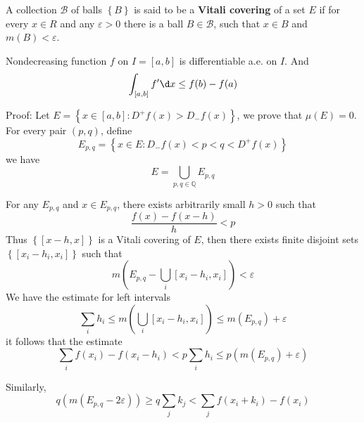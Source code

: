 \documentclass[12pt, a4paper, oneside]{book}
\begin{document}
\begin{definition}
    A collection $\mathcal{B}$ of balls $\left\{B\right\}$ is said to be a \textbf{Vitali covering} of a set $E$ if for every $x \in R$ and any $\varepsilon >0$ there is a ball $B \in \mathcal{B}$, such that $x\in B$ and $m\left(B\right) < \varepsilon$.
\end{definition}

\begin{theorem}

\end{theorem}


\begin{theorem}
    Nondecreasing function $f$ on $I=[a,b]$ is differentiable a.e. on $I$. And
    \begin{equation*}
        \int_{[a,b]} f' \d x \leq f(b) -f(a)
    \end{equation*}

    Proof:
    Let
    \( E =  \left\{x \in [a, b] : D^+ f(x) > D_- f(x) \right\} \), we prove that \( \mu(E) = 0 \).
    For every pair $\left(p,q\right)$, define
    \begin{equation*}
        E_{p,q}
        =
        \left\{x\in E : D_{-}f(x)<p<q< D^+ f(x) \right\}
    \end{equation*}
    we have
    \begin{equation*}
        E
        =
        \bigcup_{p,q \in \mathbb{Q}} E_{p,q}
    \end{equation*}

    For any $E_{p,q}$ and $x\in E_{p,q}$, there exists arbitrarily small $h >0$ such that
    \begin{equation*}
        \frac{f(x)-f(x-h)}{h} <p
    \end{equation*}
    Thus $\left\{[x-h,x]\right\}$ is a Vitali covering of $E$, then there exists finite disjoint sets $\left\{[x_i-h_i,x_i]\right\}$ such that
    \begin{equation*}
        m\left(E_{p,q} - \bigcup_i [x_i-h_i,x_i]\right)
        <
        \varepsilon
    \end{equation*}
    We have the estimate for left intervals
    \begin{equation*}
        \sum_i h_i
        \leq
        m\left(\bigcup_i [x_i-h_i,x_i]\right)
        \leq
        m(E_{p,q}) +\varepsilon
    \end{equation*}
    it follows that the estimate
    \begin{equation*}
        \sum_i f(x_i) -f(x_i - h_i)
        <
        p \sum_i h_i
        \leq
        p(m(E_{p,q}) +\varepsilon)
    \end{equation*}

    Similarly,
    \begin{equation*}
        q(m(E_{p,q}-2\varepsilon))
        \geq
        q \sum_j k_j
        <
        \sum_j f(x_i+k_i) -f(x_i )
    \end{equation*}













\end{theorem}
\end{document}
